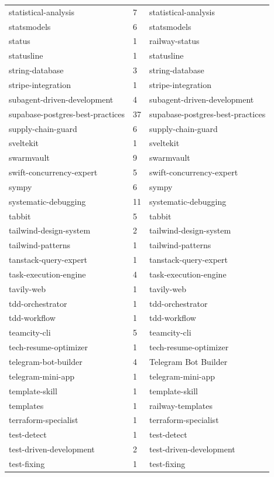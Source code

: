 \begin{longtable}{@{}lll@{}}
statistical-analysis & 7 & statistical-analysis\\
statsmodels & 6 & statsmodels\\
status & 1 & railway-status\\
statusline & 1 & statusline\\
string-database & 3 & string-database\\
stripe-integration & 1 & stripe-integration\\
subagent-driven-development & 4 & subagent-driven-development\\
supabase-postgres-best-practices & 37 & supabase-postgres-best-practices\\
supply-chain-guard & 6 & supply-chain-guard\\
sveltekit & 1 & sveltekit\\
swarmvault & 9 & swarmvault\\
swift-concurrency-expert & 5 & swift-concurrency-expert\\
sympy & 6 & sympy\\
systematic-debugging & 11 & systematic-debugging\\
tabbit & 5 & tabbit\\
tailwind-design-system & 2 & tailwind-design-system\\
tailwind-patterns & 1 & tailwind-patterns\\
tanstack-query-expert & 1 & tanstack-query-expert\\
task-execution-engine & 4 & task-execution-engine\\
tavily-web & 1 & tavily-web\\
tdd-orchestrator & 1 & tdd-orchestrator\\
tdd-workflow & 1 & tdd-workflow\\
teamcity-cli & 5 & teamcity-cli\\
tech-resume-optimizer & 1 & tech-resume-optimizer\\
telegram-bot-builder & 4 & Telegram Bot Builder\\
telegram-mini-app & 1 & telegram-mini-app\\
template-skill & 1 & template-skill\\
templates & 1 & railway-templates\\
terraform-specialist & 1 & terraform-specialist\\
test-detect & 1 & test-detect\\
test-driven-development & 2 & test-driven-development\\
test-fixing & 1 & test-fixing\\

\end{longtable}
